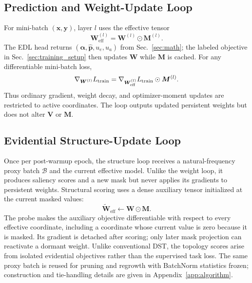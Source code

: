 \documentclass[letterpaper]{article}
\begin{document}
\subsection{Prediction and Weight-Update Loop}\label{sec:weight_loop}
For mini-batch $(\bm x,\bm y)$, layer $l$ uses the effective tensor
\begin{equation}\label{eq:wrapped_weights}
    \bm{W}_{\text{eff}}^{(l)}=\bm{W}^{(l)}\odot\bm{M}^{(l)} .
\end{equation}
The EDL head returns $(\bm\alpha,\hat{\bm p},u_e,u_a)$ from Sec.~\ref{sec:math}; the labeled objective in Sec.~\ref{sec:training_setup} then updates $\bm W$ while $\bm M$ is cached. For any differentiable mini-batch loss,
\begin{equation}\label{eq:masked_gradient}
    \nabla_{\bm W^{(l)}}L_{\rm train}
    =\nabla_{\bm W_{\rm eff}^{(l)}}L_{\rm train}\odot\bm M^{(l)}.
\end{equation}
Thus ordinary gradient, weight decay, and optimizer-moment updates are restricted to active coordinates. The loop outputs updated persistent weights but does not alter $\bm V$ or $\bm M$.

\subsection{Evidential Structure-Update Loop}\label{sec:structure_loop}
Once per post-warmup epoch, the structure loop receives a natural-frequency proxy batch $\mathcal B$ and the current effective model. Unlike the weight loop, it produces saliency scores and a new mask but never applies its gradients to persistent weights. Structural scoring uses a dense auxiliary tensor initialized at the current masked values:
\begin{equation}\label{eq:virtual_probe}
    \widetilde{\bm W}_{\mathrm{eff}}\leftarrow\bm W\odot\bm M .
\end{equation}
The probe makes the auxiliary objective differentiable with respect to every effective coordinate, including a coordinate whose current value is zero because it is masked. Its gradient is detached after scoring; only later mask projection can reactivate a dormant weight. Unlike conventional DST, the topology scores arise from isolated evidential objectives rather than the supervised task loss. The same proxy batch is reused for pruning and regrowth with BatchNorm statistics frozen; construction and tie-handling details are given in Appendix~\ref{app:algorithm}.
\end{document}
